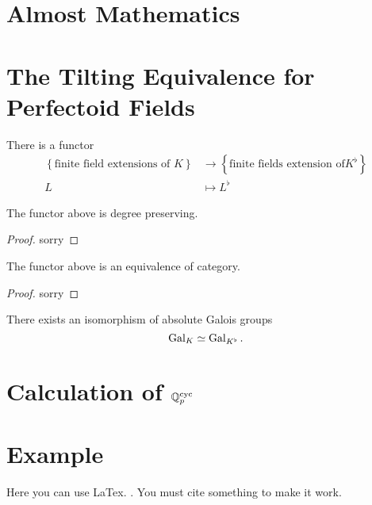 \section{Almost Mathematics}

\section{The Tilting Equivalence for Perfectoid Fields}

\begin{definition}
    \label{Tilting Functor (Finite Extension)}
    \notready

    There is a functor 
    \begin{align*}
        \left \{ \text{finite field extensions of } K \right \} & \to \left \{ \text{finite fields extension of} K^\flat \right \} \\
        L & \mapsto L^\flat
    \end{align*}

\end{definition}

\begin{theorem}
    \label{tilting_finite_degree_preserving}
    \notready

    The functor above is degree preserving.
\end{theorem}

\begin{proof}
    \notready

    sorry
\end{proof}

\begin{theorem}
    \label{tilting_finite_equivalence_of_category}
    \notready

    The functor above is an equivalence of category.
\end{theorem}

\begin{proof}
    \notready

    sorry
\end{proof}

\begin{definition}
    \label{Galois Isomorphism of Perfectoid Fields}
    
    \notready

    There exists an isomorphism of absolute Galois groups
    $$ \operatorname{Gal}_K \simeq \operatorname{Gal}_{K^\flat}.$$
\end{definition}

\section{Calculation of $\mathbb{Q}_p^{{\text{cyc}}}$}


\section{Example}
Here you can use LaTex. \cite{marcus}. You must cite something to make it work.


